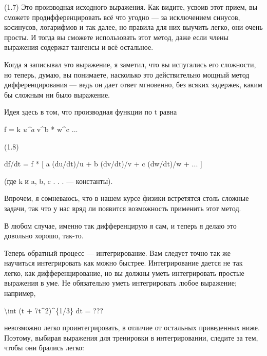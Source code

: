 \documentclass[10pt,oneside]{article}
\newcommand{\TipsSubsection}[1]{\par\vspace{6bp}{\normalsize\bfseries #1\par}\vspace{2bp}}
\begin{document}
(1.7) Это производная исходного выражения. Как видите, усвоив этот прием, вы сможете продифференцировать всё что угодно --- за исключением синусов, косинусов, логарифмов и так далее, но правила для них выучить легко, они очень просты. И тогда вы сможете использовать этот метод, даже если члены выражения содержат тангенсы и всё остальное.\par

Когда я записывал это выражение, я заметил, что вы испугались его сложности, но теперь, думаю, вы понимаете, насколько это действительно мощный метод дифференцирования --- ведь он дает ответ мгновенно, без всяких задержек, каким бы сложным ни было выражение.\par

Идея здесь в том, что производная функции по t равна\par

f = k \emph{ u\textasciicircum{}a } v\textasciicircum{}b * w\textasciicircum{}c ...\par

(1.8)\par

df/dt = f * [ a (du/dt)/u + b (dv/dt)/v + c (dw/dt)/w + ... ]\par

(где k и a, b, c . . . --- константы).\par

Впрочем, я сомневаюсь, что в нашем курсе физики встретятся столь сложные задачи, так что у нас вряд ли появится возможность применить этот метод.\par

В любом случае, именно так дифференцирую я сам, и теперь я делаю это довольно хорошо, так-то.\par

\TipsSubsection{1-5 Интегрирование}

Теперь обратный процесс --- интегрирование. Вам следует точно так же научиться интегрировать как можно быстрее. Интегрирование дается не так легко, как дифференцирование, но вы должны уметь интегрировать простые выражения в уме. Не обязательно уметь интегрировать любое выражение; например,\par

\textbackslash{}int (t + 7t\textasciicircum{}2)\textasciicircum{}\{1/3\} dt = ???\par

невозможно легко проинтегрировать, в отличие от остальных приведенных ниже. Поэтому, выбирая выражения для тренировки в интегрировании, следите за тем, чтобы они брались легко:\par
\end{document}
